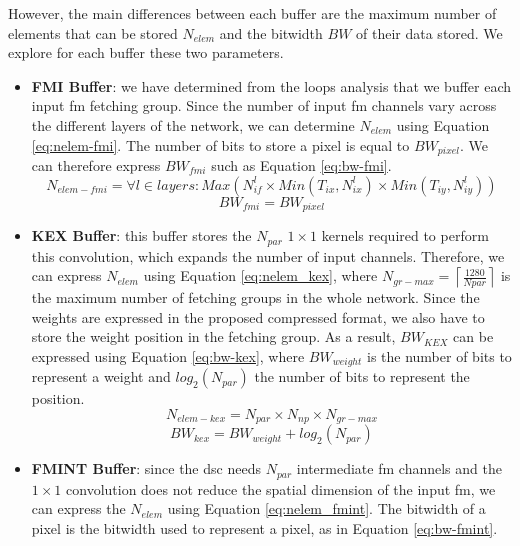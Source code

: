 However, the main differences between each buffer are the maximum number of elements that can be stored $N_{elem}$ and the bitwidth $BW$ of their data stored. We explore for each buffer these two parameters.
\begin{itemize}
    \item \textbf{FMI Buffer}: we have determined from the loops analysis that we buffer each input \acrshort{fm} fetching group. Since the number of input \acrshort{fm} channels vary across the different layers of the network, we can determine $N_{elem}$ using Equation \eqref{eq:nelem-fmi}. The number of bits to store a pixel is equal to $BW_{pixel}$. We can therefore express $BW_{fmi}$ such as Equation \eqref{eq:bw-fmi}.
    \begin{equation}
        N_{elem-fmi} = \forall l \in layers: Max\left( N_{if}^l \times Min\left(T_{ix}, N_{ix}^l\right) \times Min\left(T_{iy}, N_{iy}^l\right) \right)
        \label{eq:nelem-fmi}
    \end{equation}
    \begin{equation}
        BW_{fmi} = BW_{pixel}
        \label{eq:bw-fmi}
    \end{equation}
    \item \textbf{KEX Buffer}: this buffer stores the $N_{par}$ $1 \times 1$ kernels required to perform this convolution, which expands the number of input channels. Therefore, we can express $N_{elem}$ using Equation \eqref{eq:nelem_kex}, where $N_{gr-max} = \left\lceil \frac{1280}{Npar} \right\rceil$ is the maximum number of fetching groups in the whole network. Since the weights are expressed in the proposed compressed format, we also have to store the weight position in the fetching group.
    As a result, $BW_{KEX}$ can be expressed using Equation \eqref{eq:bw-kex}, where $BW_{weight}$ is the number of bits to represent a weight and $log_2(N_{par})$ the number of bits to represent the position.
    \begin{equation}
        N_{elem-kex} = N_{par} \times N_{np} \times N_{gr-max}
        \label{eq:nelem_kex}
    \end{equation}
    \begin{equation}
        BW_{kex} = BW_{weight} + log_2(N_{par})
        \label{eq:bw-kex}
    \end{equation}
    \item \textbf{FMINT Buffer}: since the \acrshort{dsc} needs $N_{par}$ intermediate \acrshort{fm} channels and the $1 \times 1$ convolution does not reduce the spatial dimension of the input \acrshort{fm}, we can express the $N_{elem}$ using Equation \eqref{eq:nelem_fmint}. The bitwidth of a pixel is the bitwidth used to represent a pixel, as in Equation \eqref{eq:bw-fmint}.

\end{itemize}
